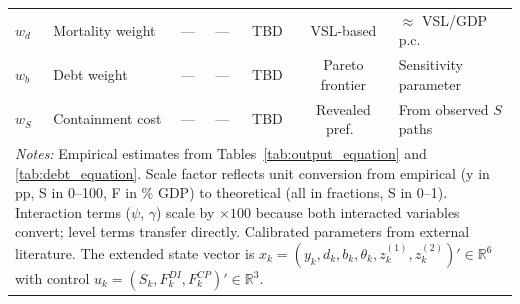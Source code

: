 \begin{table}[htbp]
\begin{tabular}{llccccl}
$w_d$            & Mortality weight           & ---       & ---          & TBD      & VSL-based  & $\approx$ VSL/GDP p.c. \\
$w_b$            & Debt weight               & ---       & ---          & TBD      & Pareto frontier & Sensitivity parameter \\
$w_S$            & Containment cost          & ---       & ---          & TBD      & Revealed pref.\ & From observed $S$ paths \\[4pt]
\bottomrule
\multicolumn{7}{p{14.5cm}}{\footnotesize \textit{Notes:} Empirical estimates from Tables~\ref{tab:output_equation} and \ref{tab:debt_equation}. Scale factor reflects unit conversion from empirical (y in pp, S in 0--100, F in \% GDP) to theoretical (all in fractions, S in 0--1). Interaction terms ($\psi$, $\gamma$) scale by $\times 100$ because both interacted variables convert; level terms transfer directly. Calibrated parameters from external literature. The extended state vector is $x_k = (y_k, d_k, b_k, \theta_k, z_k^{(1)}, z_k^{(2)})' \in \mathbb{R}^6$ with control $u_k = (S_k, F_k^{DI}, F_k^{CP})' \in \mathbb{R}^3$.} \\
\end{tabular}
\end{table}
